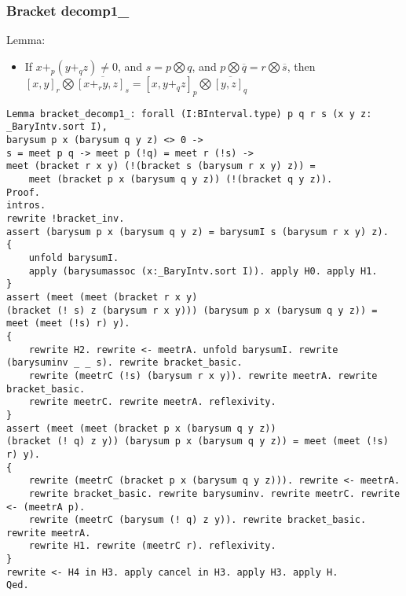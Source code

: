 \documentclass[a4paper,10pt]{article} %
\begin{document}
\subsubsection{Bracket decomp1\_}
Lemma:
\begin{itemize}
    \item If $x + _p(y +_qz) \neq 0$, and $s = p \bigotimes q$, and $p \bigotimes \overline{q} = r \bigotimes \overline{s}$, then $[x, y]_r \bigotimes \overline{[x + _ry, z]_s} = [x, y +_qz]_p \bigotimes \overline{[y, z]_q}$
\end{itemize}
\begin{lstlisting}
Lemma bracket_decomp1_: forall (I:BInterval.type) p q r s (x y z: _BaryIntv.sort I),
barysum p x (barysum q y z) <> 0 ->
s = meet p q -> meet p (!q) = meet r (!s) ->  
meet (bracket r x y) (!(bracket s (barysum r x y) z)) = 
    meet (bracket p x (barysum q y z)) (!(bracket q y z)).
Proof.
intros.
rewrite !bracket_inv. 
assert (barysum p x (barysum q y z) = barysumI s (barysum r x y) z).
{
    unfold barysumI.
    apply (barysumassoc (x:_BaryIntv.sort I)). apply H0. apply H1.
} 
assert (meet (meet (bracket r x y)
(bracket (! s) z (barysum r x y))) (barysum p x (barysum q y z)) = meet (meet (!s) r) y).
{
    rewrite H2. rewrite <- meetrA. unfold barysumI. rewrite (barysuminv _ _ s). rewrite bracket_basic.
    rewrite (meetrC (!s) (barysum r x y)). rewrite meetrA. rewrite bracket_basic. 
    rewrite meetrC. rewrite meetrA. reflexivity.
}
assert (meet (meet (bracket p x (barysum q y z))
(bracket (! q) z y)) (barysum p x (barysum q y z)) = meet (meet (!s) r) y).
{
    rewrite (meetrC (bracket p x (barysum q y z))). rewrite <- meetrA.
    rewrite bracket_basic. rewrite barysuminv. rewrite meetrC. rewrite <- (meetrA p).
    rewrite (meetrC (barysum (! q) z y)). rewrite bracket_basic. rewrite meetrA. 
    rewrite H1. rewrite (meetrC r). reflexivity.
}
rewrite <- H4 in H3. apply cancel in H3. apply H3. apply H.
Qed.
\end{lstlisting}
\end{document}
